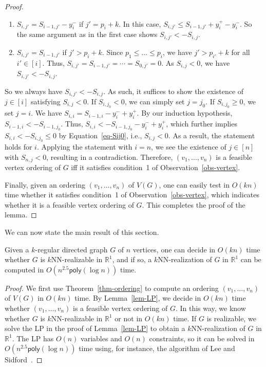\begin{proof}
\begin{enumerate}
    By our induction hypothesis, $S_{i-1,j'} < -S_{i-1,j}$.
    Thus, $S_{i,j'} < -S_{i-1,j} + y_i^+ - y_i^-$.
    By Equation~\ref{eq-Sij0}, this implies $S_{i,j'} < -S_{i,j}$.
    \item $S_{i,j'} = S_{i-1,j'}-y_i^-$ if $j' = p_i+k$.
    In this case, $S_{i,j'} \leq S_{i-1,j'} + y_i^+ - y_i^-$.
    So the same argument as in the first case shows $S_{i,j'} < -S_{i,j}$.
    \item $S_{i,j'} = S_{i-1,j'}$ if $j' > p_i+k$.
    Since $p_1 \leq \dots \leq p_i$, we have $j' > p_{i'} + k$ for all $i' \in [i]$.
    Thus, $S_{i,j'} = S_{i-1,j'} = \cdots = S_{0,j'} = 0$.
    As $S_{i,j} < 0$, we have $S_{i,j'} < -S_{i,j}$.
\end{enumerate}
So we always have $S_{i,j'} < -S_{i,j}$.
As such, it suffices to show the existence of $j \in [i]$ satisfying $S_{i,j} < 0$.
If $S_{i,j_0} < 0$, we can simply set $j = j_0$.
If $S_{i,j_0} \geq 0$, we set $j = i$.
We have $S_{i,i} = S_{i-1,i} - y_i^- + y_i^+$.
By our induction hypothesis, $S_{i-1,i} < -S_{i-1,j_0}$.
Thus, $S_{i,i} < -S_{i-1,j_0} - y_i^- + y_i^+$, which further implies $S_{i,i} < - S_{i,j_0} \leq 0$ by Equation~\ref{eq-Sij0}, i.e., $S_{i,j} < 0$.
As a result, the statement holds for $i$.
Applying the statement with $i = n$, we see the existence of $j \in [n]$ with $S_{n,j} < 0$, resulting in a contradiction.
Therefore, $(v_1,\dots,v_n)$ is a feasible vertex ordering of $G$ iff it satisfies condition~1 of Observation~\ref{obs-vertex}.

Finally, given an ordering $(v_1,\dots,v_n)$ of $V(G)$, one can easily test in $O(kn)$ time whether it satisfies condition~1 of Observation~\ref{obs-vertex}, which indicates whether it is a feasible vertex ordering of $G$.
This completes the proof of the lemma.
\end{proof}
\noindent
We can now state the main result of this section.

\begin{theorem} \label{thm:final}
Given a $k$-regular directed graph $G$ of $n$ vertices, one can decide in $O(kn)$ time whether $G$ is $k$NN-realizable in $\mathbb{R}^1$, and if so, a $k$NN-realization of $G$ in $\mathbb{R}^1$ can be computed in $O(n^{2.5} \mathsf{poly}(\log n))$ time.
\end{theorem}

\begin{proof}
We first use Theorem~\ref{thm-ordering} to compute an ordering $(v_1,\dots,v_n)$ of $V(G)$ in $O(kn)$ time. By Lemma~\ref{lem-LP}, we decide in $O(kn)$ time whether $(v_1,\dots,v_n)$ is a feasible vertex ordering of $G$. In this way, we know whether $G$ is $k$NN-realizable in $\mathbb{R}^1$ or not in $O(kn)$ time. If $G$ is realizable, we solve the LP in the proof of Lemma~\ref{lem-LP} to obtain a $k$NN-realization of $G$ in $\mathbb{R}^1$. The LP has $O(n)$ variables and $O(n)$ constraints, so it can be solved in $O(n^{2.5} \mathsf{poly} (\log n))$ time using, for instance, the algorithm of Lee and Sidford~\cite{lee2015efficient}.
\end{proof}

